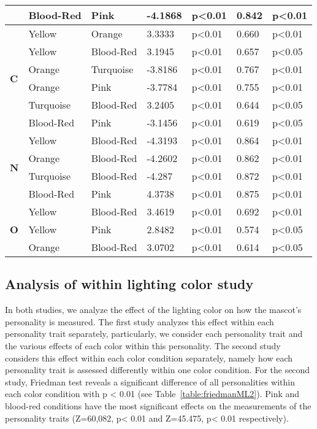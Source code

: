 \begin{longtable} { |p{0.5cm}| p{2cm}|p{2cm}|p{1.5cm}| p{1.7cm}|p{1cm}|p{1.5cm}|  }
&Blood-Red	&Pink		&-4.1868	&p<0.01	&0.842		&p<0.01\\
\hline 
\hline 
\multirow{6}{*}{\textbf{C}} 
&Yellow		&Orange		&3.3333	&p<0.01	&0.660		&p<0.01\\
&Yellow		&Blood-Red	&3.1945	&p<0.01	&0.657 		&p<0.05\\
&Orange		&Turquoise	&-3.8186	&p<0.01	&0.767		&p<0.01\\
&Orange		&Pink		&-3.7784	&p<0.01	&0.755		&p<0.01\\
&Turquoise	&Blood-Red	&3.2405	&p<0.01	&0.644		&p<0.05\\
&Blood-Red	&Pink		&-3.1456	&p<0.01	&0.619		&p<0.05\\
\hline 
\hline 
\multirow{4}{*}{\textbf{N}} 
&Yellow		&Blood-Red	&-4.3193	&p<0.01	&0.864		&p<0.01\\
&Orange		&Blood-Red	&-4.2602	&p<0.01	&0.862		&p<0.01\\
&Turquoise	&Blood-Red	&-4.287	&p<0.01	&0.872		&p<0.01\\
&Blood-Red	&Pink		&4.3738	&p<0.01	&0.875		&p<0.01\\
\hline 
\hline 
\multirow{4}{*}{\textbf{O}} 
&Yellow		&Blood-Red	&3.4619	&p<0.01	&0.692		&p<0.01\\
&Yellow		&Pink		&2.8482	&p<0.01	&0.574		&p<0.05\\
&Orange		&Blood-Red	&3.0702	&p<0.01	&0.614		&p<0.05\\
\hline 
\end{longtable}

\subsection{Analysis of within lighting color study}
\label{Study2(M-L)}
In both studies, we analyze the effect of the lighting color on how the mascot’s personality is measured.
The first study analyzes this effect within each personality trait separately, particularly, we consider each
personality trait and the various effects of each color within this personality. The second study considers this
effect within each color condition separately, namely how each personality trait is assessed differently within one color condition.
For the second study, Friedman test reveals a significant difference of all personalities within each color
condition with p < 0.01 (see Table~\ref{table:friedmanML2}). Pink and blood-red conditions have the most significant
effects on the measurements of the personality traits
(Z=60,082, p< 0.01 and Z=45.475, p< 0.01 respectively). 

